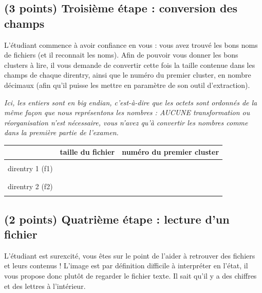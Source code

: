 \documentclass[11pt,a4paper]{article}
\begin{document}

\newpage

\subsection{(3 points) Troisième étape : conversion des champs }

L'étudiant commence à avoir confiance en vous : vous avez trouvé les bons noms de fichiers (et il reconnait les noms).
Afin de pouvoir vous donner les bons clusters à lire, il vous demande de convertir cette fois la taille contenue dans les champs de chaque direntry, ainsi que le numéro du premier cluster, en nombre décimaux (afin qu'il puisse les mettre en paramètre de son outil d'extraction).

\smallskip

\textit{Ici, les entiers sont en big endian, c'est-à-dire que les octets sont ordonnés de la même façon que nous représentons les nombres : AUCUNE transformation ou réorganisation n'est nécessaire, vous n'avez qu'à convertir les nombres comme dans la première partie de l'examen.}

\smallskip

\begin{center}
\begin{tabular}{ | c | C{5cm} | C{7.5cm} | }
\hline
 & taille du fichier & numéro du premier cluster \\
\hline
 & & \\
direntry 1 (f1) & & \\
 & & \\
\hline
 & & \\
direntry 2 (f2) & & \\
 & & \\
\hline
\end{tabular}
\end{center}

\smallskip

\subsection{(2 points) Quatrième étape : lecture d'un fichier }

L'étudiant est surexcité, vous êtes sur le point de l'aider à retrouver des fichiers et leurs contenus !
L'image est par définition difficile à interpréter en l'état, il vous propose donc plutôt de regarder le fichier texte.
Il sait qu'il y a des chiffres et des lettres à l'intérieur.
\end{document}
